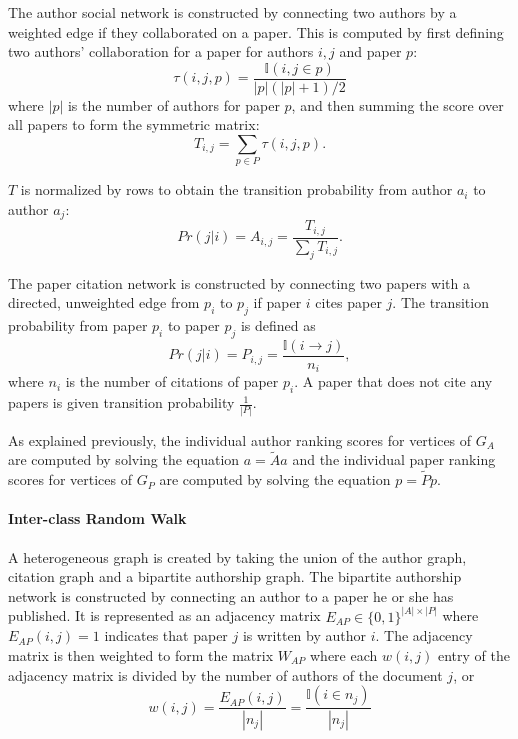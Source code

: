The author social network is constructed by connecting two authors by a weighted edge if they collaborated on a paper. This is computed by first defining two authors' collaboration for a paper for authors $i,j$ and paper $p$:
    \begin{equation}
        \tau(i,j,p) = \frac{\mathbb{I}(i,j \in p)}{|p|(|p|+1)/2}    
    \end{equation}
where $|p|$ is the number of authors for paper $p$, and then summing the score over all papers to form the symmetric matrix:
    \begin{equation}
        T_{i,j} = \sum_{p \in P} \tau(i,j,p).
    \end{equation}

$T$ is normalized by rows to obtain the transition probability from author $a_i$ to author $a_j$:
    \begin{equation}
        Pr(j|i) = A_{i,j} = \frac{T_{i,j}}{\sum_j T_{i,j}}.
    \end{equation} 

The paper citation network is constructed by connecting two papers with a directed, unweighted edge from $p_i$ to $p_j$ if paper $i$ cites paper $j$. The transition probability from paper $p_i$ to paper $p_j$ is defined as 
    \begin{equation}
        Pr(j|i) = P_{i,j} = \frac{\mathbb{I}(i \rightarrow j)}{n_i},
    \end{equation}
where $n_i$ is the number of citations of paper $p_i$. A paper that does not cite any papers is given transition probability $\frac{1}{|P|}$.

As explained previously, the individual author ranking scores for vertices of $G_A$ are computed by solving the equation $a = \tilde{A}a$ and the individual paper ranking scores for vertices of $G_P$ are computed by solving the equation $p = \tilde{P}p$.


\paragraph{Inter-class Random Walk}
A heterogeneous graph is created by taking the union of the author graph, citation graph and a bipartite authorship graph. The bipartite authorship network is constructed by connecting an author to a paper he or she has published. It is represented as an adjacency matrix $E_{AP} \in \{0,1\}^{|A| \times |P|}$ where $E_{AP}(i,j) = 1$ indicates that paper $j$ is written by author $i$. The adjacency matrix is then weighted to form the matrix $W_{AP}$ where each $w(i,j)$ entry of the adjacency matrix is divided by the number of authors of the document $j$, or 
    \begin{equation}
        w(i,j) = \frac{E_{AP}(i,j)}{|n_j|} = \frac{\mathbb{I}(i \in n_j)}{|n_j|}
    \end{equation}

